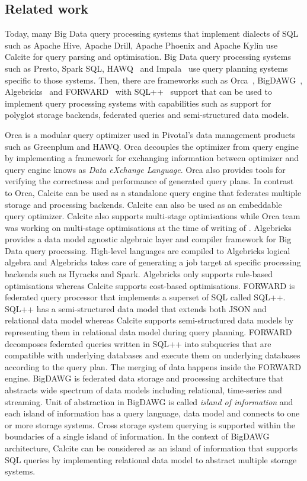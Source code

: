 \subsection{Related work}
\label{subsec:related}

Today, many Big Data query processing systems that implement dialects of SQL such as Apache Hive, Apache Drill, Apache Phoenix and Apache Kylin use Calcite for query parsing and optimisation. Big Data query processing systems such as Presto, Spark SQL, HAWQ~\cite{chang2014hawq} and Impala~\cite{kornacker2015impala} use query planning systems specific to those systems. Then,  there are frameworks such as Orca~\cite{Soliman:2014:OMQ:2588555.2595637}, BigDAWG~\cite{duggan2015bigdawg}, Algebricks~\cite{borkar2015algebricks} and FORWARD~\cite{fu2011sql} with SQL++~\cite{ong2014sql++} support that can be used to implement query processing systems with capabilities such as support for polyglot storage backends, federated queries and semi-structured data models.

Orca is a modular query optimizer used in Pivotal's data management products such as  Greenplum and HAWQ.  Orca decouples the optimizer from query engine by implementing a framework for exchanging information between optimizer and query engine knows as \emph{Data eXchange Language}.  Orca also provides tools for verifying the correctness and performance of generated query plans. In contrast to Orca, Calcite can be used as a standalone query engine that federates multiple storage and processing backends. Calcite can also be used as an embeddable query optimizer. Calcite also supports multi-stage optimisations while Orca team was working on multi-stage optimisations at the time of writing of \cite{orca}. Algebricks provides a data model agnostic algebraic layer and compiler framework for Big Data query processing. High-level languages are compiled to Algebricks logical algebra and Algebricks takes care of generating a job target at specific processing backends such as Hyracks and Spark. Algebricks only supports rule-based optimisations whereas Calcite supports cost-based optimisations. FORWARD is federated query processor that implements a superset of SQL called SQL++. SQL++ has a semi-structured data model that extends both JSON and relational data model whereas Calcite supports semi-structured data models by representing them in relational data model during query planning. FORWARD decomposes federated queries written in SQL++ into subqueries that are compatible with underlying databases and execute them on underlying databases according to the query plan. The merging of data happens inside the FORWARD engine. BigDAWG is federated data storage and processing architecture that abstracts wide spectrum of data models including  relational, time-series and streaming. Unit of abstraction in BigDAWG is called \emph{island of information} and each island of information has a query language, data model and connects to one or more storage systems. Cross storage system querying is supported within the boundaries of a single island of information. In the context of BigDAWG architecture, Calcite can be considered as an island of information that supports SQL queries by implementing relational data model to abstract multiple storage systems. 
